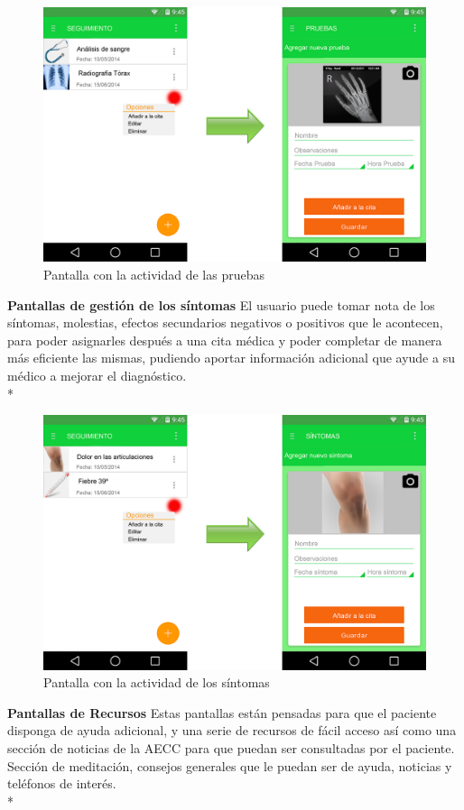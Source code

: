 \documentclass[../pfc.tex]{subfiles}
\begin{document}
			\begin{figure}[h]
				\centering
				\includegraphics[width=0.7\linewidth]{../images/pruebas}
				\caption{Pantalla con la actividad de las pruebas}
				\label{fig:pruebas}
			\end{figure}
			
			
			\textbf{Pantallas de gestión de los síntomas}
			El usuario puede tomar nota de los síntomas, molestias, efectos secundarios negativos o positivos que le acontecen, para poder asignarles después a una cita médica y poder completar de manera más eficiente las mismas, pudiendo aportar información adicional que ayude a su médico a mejorar el diagnóstico.\\*
			
			\begin{figure}[h]
				\centering
				\includegraphics[width=0.7\linewidth]{../images/sintomas}
				\caption{Pantalla con la actividad de los síntomas}
				\label{fig:sintomas}
			\end{figure}
			
			
			\textbf{Pantallas de Recursos}
			Estas pantallas están pensadas para que el paciente disponga de ayuda adicional, y una serie de recursos de fácil acceso así como una sección de noticias de la AECC para que puedan ser consultadas por el paciente.
			Sección de meditación, consejos generales que le puedan ser de ayuda, noticias y teléfonos de interés. \\*
			
\end{document}
